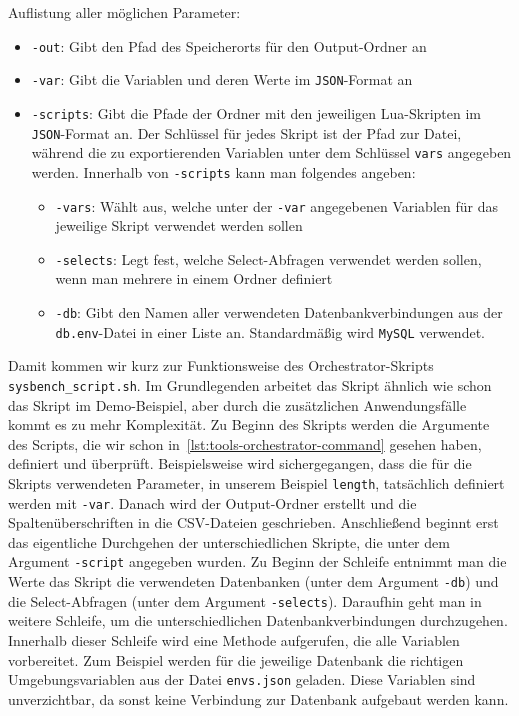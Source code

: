 Auflistung aller möglichen Parameter:
\begin{itemize}
    \setlength{\itemsep}{-5pt}
    \item \texttt{-out}: Gibt den Pfad des Speicherorts für den Output-Ordner an
    \item \texttt{-var}: Gibt die Variablen und deren Werte im \texttt{JSON}-Format an
    \item \texttt{-scripts}: Gibt die Pfade der Ordner mit den jeweiligen Lua-Skripten im \texttt{JSON}-Format an.
    Der Schlüssel für jedes Skript ist der Pfad zur Datei, während die zu exportierenden Variablen unter dem Schlüssel \texttt{vars} angegeben werden.
    \newline Innerhalb von \texttt{-scripts} kann man folgendes angeben:
    \begin{itemize}
        \setlength{\itemsep}{-5pt}
        \item \texttt{-vars}: Wählt aus, welche unter der \texttt{-var} angegebenen Variablen für das jeweilige Skript verwendet werden sollen
        \item \texttt{-selects}: Legt fest, welche Select-Abfragen verwendet werden sollen, wenn man mehrere in einem Ordner definiert
        \item \texttt{-db}: Gibt den Namen aller verwendeten Datenbankverbindungen aus der \texttt{db.env}-Datei in einer Liste an.
        Standardmäßig wird \texttt{MySQL} verwendet.
    \end{itemize}
\end{itemize}

Damit kommen wir kurz zur Funktionsweise des Orchestrator-Skripts \texttt{sysbench\_script.sh}.
Im Grundlegenden arbeitet das Skript ähnlich wie schon das Skript im Demo-Beispiel, aber durch die zusätzlichen Anwendungsfälle kommt es zu mehr Komplexität.
Zu Beginn des Skripts werden die Argumente des Scripts, die wir schon in~\ref{lst:tools-orchestrator-command} gesehen haben, definiert und überprüft.
Beispielsweise wird sichergegangen, dass die für die Skripts verwendeten Parameter, in unserem Beispiel \texttt{length}, tatsächlich definiert werden mit \texttt{-var}.
Danach wird der Output-Ordner erstellt und die Spaltenüberschriften in die CSV-Dateien geschrieben.
Anschließend beginnt erst das eigentliche Durchgehen der unterschiedlichen Skripte, die unter dem Argument \texttt{-script} angegeben wurden.
Zu Beginn der Schleife entnimmt man die Werte das Skript die verwendeten Datenbanken (unter dem Argument \texttt{-db}) und die Select-Abfragen (unter dem Argument \texttt{-selects}).
Daraufhin geht man in weitere Schleife, um die unterschiedlichen Datenbankverbindungen durchzugehen.
Innerhalb dieser Schleife wird eine Methode aufgerufen, die alle Variablen vorbereitet.
Zum Beispiel werden für die jeweilige Datenbank die richtigen Umgebungsvariablen aus der Datei \texttt{envs.json} geladen.
Diese Variablen sind unverzichtbar, da sonst keine Verbindung zur Datenbank aufgebaut werden kann.

